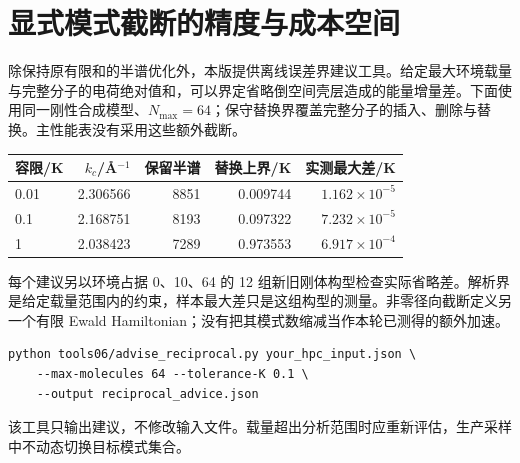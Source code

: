 \section{显式模式截断的精度与成本空间}

除保持原有限和的半谱优化外，本版提供离线误差界建议工具。给定最大环境载量与完整分子的电荷绝对值和，可以界定省略倒空间壳层造成的能量增量差。下面使用同一刚性合成模型、$N_{\max}=64$；保守替换界覆盖完整分子的插入、删除与替换。主性能表没有采用这些额外截断。

\begin{center}\small
\begin{tabular}{@{}lrrrr@{}}\toprule
容限/K & $k_c$/\AA$^{-1}$ & 保留半谱 & 替换上界/K & 实测最大差/K\\\midrule
0.01 & 2.306566 & 8851 & 0.009744 & $1.162\times10^{-5}$\\
0.1 & 2.168751 & 8193 & 0.097322 & $7.232\times10^{-5}$\\
1 & 2.038423 & 7289 & 0.973553 & $6.917\times10^{-4}$\\
\bottomrule\end{tabular}\end{center}

每个建议另以环境占据 0、10、64 的 12 组新旧刚体构型检查实际省略差。解析界是给定载量范围内的约束，样本最大差只是这组构型的测量。非零径向截断定义另一个有限 Ewald Hamiltonian；没有把其模式数缩减当作本轮已测得的额外加速。

\begin{lstlisting}
python tools06/advise_reciprocal.py your_hpc_input.json \
    --max-molecules 64 --tolerance-K 0.1 \
    --output reciprocal_advice.json
\end{lstlisting}

该工具只输出建议，不修改输入文件。载量超出分析范围时应重新评估，生产采样中不动态切换目标模式集合。
